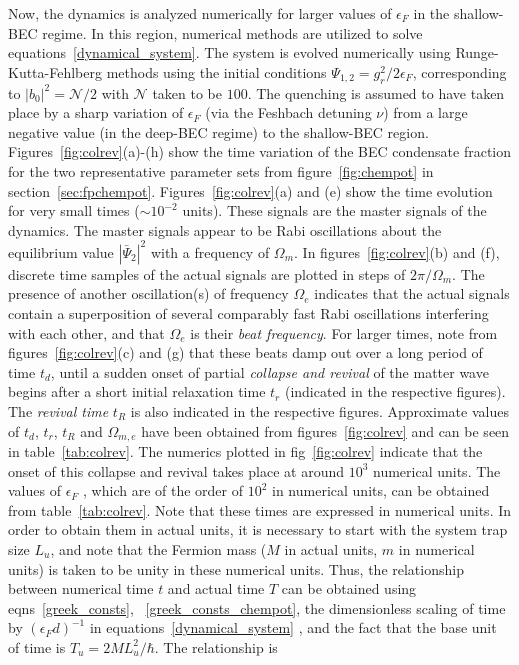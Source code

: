 \documentclass[a4paper,10pt]{article}
\begin{document}
Now, the dynamics is analyzed numerically for larger values of $\epsilon_F$ in the shallow-BEC regime. In this region, numerical methods are utilized to solve equations~\ref{dynamical_system}. The system is evolved numerically using Runge-Kutta-Fehlberg methods using the initial conditions $\Psi_{1,2} = g^2_r / 2 \epsilon_F$, corresponding to $|b_0|^2 = \mathcal{N}/2$ with $\mathcal{N}$ taken to be $100$. The quenching is assumed to have taken place by a sharp variation of $\epsilon_F$ (via the Feshbach detuning $\nu$) from a large negative value (in the deep-BEC regime) to the shallow-BEC region. Figures~\ref{fig:colrev}(a)-(h) show the time variation of the BEC condensate fraction for the two representative parameter sets from figure~\ref{fig:chempot} in section~\ref{sec:fpchempot}. Figures~\ref{fig:colrev}(a) and (e) show the time evolution for very small times ($ \sim 10^{-2}$ units). These signals are the master signals of the dynamics. The master signals appear to be Rabi oscillations about the equilibrium value $|\bar{\Psi}_2|^2$ with a frequency of $\Omega_m$. In figures~\ref{fig:colrev}(b) and (f), discrete time samples of the actual signals are plotted in steps of $2\pi/\Omega_m$. The presence of another oscillation(s) of frequency $\Omega_e$ indicates that the actual signals contain a superposition of several comparably fast Rabi oscillations interfering with each other, and that $\Omega_e$ is their \textit{beat frequency}. For larger times, note from figures~\ref{fig:colrev}(c) and (g) that these beats damp out over a long period of time $t_d$, until a sudden onset of partial \textit{collapse and revival} of the matter wave begins after a short initial relaxation time $t_r$ (indicated in the respective figures). The \textit{revival time} $t_R$ is also indicated in the respective figures. Approximate values of $t_d$, $t_r$, $t_R$ and $\Omega_{m,e}$ have been obtained from figures~\ref{fig:colrev} and can be seen in table~\ref{tab:colrev}. 
The numerics plotted in fig~\ref{fig:colrev} indicate that the onset of this collapse and revival takes place at around $10^3$ numerical units. The values of $\epsilon_F$ , which are of the order of $10^2$ in numerical units, can be obtained from table~\ref{tab:colrev}. Note that these times are expressed in numerical units. In order to obtain them in actual units, it is necessary to start with the system trap size $L_u$, and note that the Fermion mass ($M$ in actual units, $m$ in numerical units) is taken to be unity in these numerical units. Thus, the relationship between numerical time $t$ and actual time $T$ can be obtained using eqns~\ref{greek_consts}, ~\ref{greek_consts_chempot}, the dimensionless scaling of time by $(\epsilon_F d)^{-1}$ in equations~\ref{dynamical_system} , and the fact that the base unit of time is $T_u = 2 M L^2_u/\hbar$. The relationship is
\end{document}
